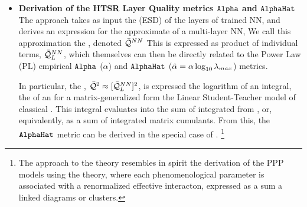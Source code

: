 \begin{itemize}
\item
  \textbf{Derivation of the HTSR Layer Quality metrics $\texttt{Alpha}$ and  $\texttt{AlphaHat}$}
  The \SETOL approach takes as input the
  \EmpiricalSpectralDensity (ESD) of the layers
  of trained NN, and  derives an expression for the approximate \emph{\AverageGeneralizationAccuracy}
  of a multi-layer NN, We call this approximation the \emph{\ModelQuality}, denoted $\bar{\mathcal{Q}}^{NN}$
  This \ModelQuality is  expressed as product of individual \LayerQuality terms, $\bar{\mathcal{Q}}^{NN}_{L}$,
  which themselves can  then 
  be directly related to the \HTSR Power Law (PL) empirical $\texttt{Alpha}$ ($\alpha$)
  and $\texttt{AlphaHat}$  ($\hat\alpha=\alpha\log_{10}\lambda_{max}$) metrics.

  In particular, the \LayerQualitySquared, $\bar{\mathcal{Q}}^{2}\approx[\bar{\mathcal{Q}}^{NN}_{L}]^{2}$, is
  expressed the logarithm of an \HCIZtext integral, the \ThermalAverage of an \EffectivePotential
  for a matrix-generalized form the Linear Student-Teacher model of classical \STATMECH. This \HCIZtext
  integral evaluates into the sum of integrated \RTransforms
  from \RMT, or, equivalently, as a sum of integrated matrix cumulants.
  From this, the \HTSR $\texttt{AlphaHat}$ metric can be derived in the special case of \IdealLearning.
  \footnote{The \SETOL approach to the \HTSR theory resembles
  in spirit the derivation of the \SemiEmpirical PPP models using
  the \EffectiveHamiltonian theory, where each phenomenological parameter is associated with  a renormalized
  effective interacton, expressed as a sum a linked diagrams or clusters.\cite{Martin1996, Martin1998}}


\end{itemize}
